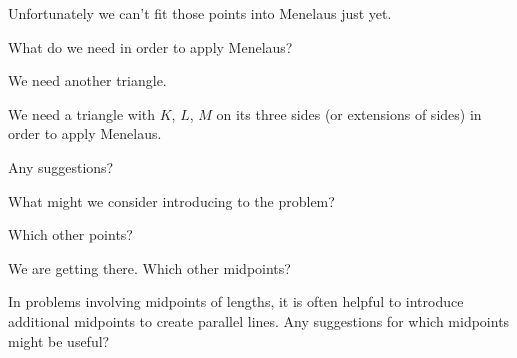 




Unfortunately we can't fit those points into Menelaus just yet.

What do we need in order to apply Menelaus?


We need another triangle.



We need a triangle with $K$, $L$, $M$ on its three sides (or extensions of sides) in order to apply Menelaus.

Any suggestions?

What might we consider introducing to the problem?


Which other points?



We are getting there.  Which other midpoints?

In problems involving midpoints of lengths, it is often helpful to introduce additional midpoints to create parallel lines. Any suggestions for which midpoints might be useful?

